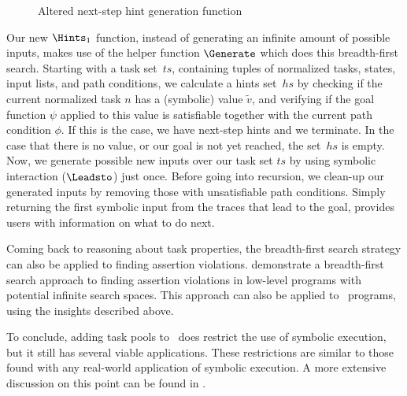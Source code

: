 \begin{figure*}
  \begin{mathpar}
  \end{mathpar}
  \caption{Altered next-step hint generation function}
  \label{fig:next-step-hints-new}
\end{figure*}

Our new $\Hints_1$ function, instead of generating an infinite amount of possible inputs,
makes use of the helper function $\Generate$ which does this breadth-first search.
Starting with a task set~$ts$, containing tuples of normalized tasks, states, input lists, and path conditions,
we calculate a hints set~$hs$ by checking if the current normalized task $n$ has a (symbolic) value $\tilde{v}$,
and verifying if the goal function $\psi$ applied to this value is satisfiable together with the current path condition $\phi$.
If this is the case, we have next-step hints and we terminate.
In the case that there is no value, or our goal is not yet reached,
the set~$hs$ is empty.
Now, we generate possible new inputs over our task set $ts$ by using symbolic interaction ($\Leadsto$) just once.
Before going into recursion, we clean-up our generated inputs by removing those with unsatisfiable path conditions.
Simply returning the first symbolic input from the traces that lead to the goal, provides users with information on what to do next.

Coming back to reasoning about task properties, the breadth-first search strategy can also be applied to finding assertion violations.
\citet{DBLP:conf/tap/NausVSR23} demonstrate a breadth-first search approach to finding assertion violations in low-level programs with potential infinite search spaces.
This approach can also be applied to \DYNTOPHAT\ programs, using the insights described above.

To conclude, adding task pools to \TOPHAT\ does restrict the use of symbolic execution, but it still has several viable applications.
These restrictions are similar to those found with any real-world application of symbolic execution.
A more extensive discussion on this point can be found in \citet{conf/ifl/NausSK19}.